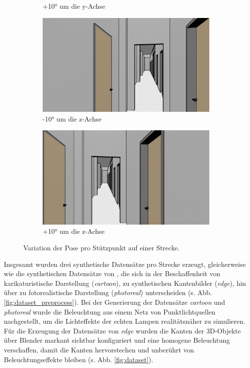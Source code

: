 \begin{figure}
\begin{subfigure}[t]{0.18\linewidth}
		\caption{+10° um die y-Achse}
		\label{subfig:iz0_y+10}
	\end{subfigure}
	\hfill
	\begin{subfigure}[t]{0.18\linewidth}
		\centering
		\includegraphics[width=\linewidth]{images/syn_dataset/00024.png}
		\caption{-10° um die z-Achse}
		\label{subfig:iz-10_y0}
	\end{subfigure}
	\hfill
	\begin{subfigure}[t]{0.18\linewidth}
		\centering
		\includegraphics[width=\linewidth]{images/syn_dataset/00022.png}
		\caption{+10° um die z-Achse}
		\label{subfig:iz+10_y0}
	\end{subfigure}
	\caption{Variation der Pose pro Stützpunkt auf einer Strecke.}
	\label{fig:dataset_variation}
\end{figure}

Insgesamt wurden drei synthetische Datensätze pro Strecke erzeugt, gleicherweise wie die synthetischen Datensätze von \citet{acharyaBIMPoseNetIndoorCamera2019}, die sich in der Beschaffenheit von karikaturistische Darstellung (\textit{cartoon}), zu synthetischen Kantenbilder (\textit{edge}), hin über zu fotorealistische Darstellung (\textit{photoreal}) unterscheiden (s. Abb. \ref{fig:dataset_preprocess}). Bei der Generierung der Datensätze \textit{cartoon} und \textit{photoreal} wurde die Beleuchtung aus einem Netz von Punktlichtquellen nachgestellt, um die Lichteffekte der echten Lampen realitätsnäher zu simulieren.
Für die Erzeugung der Datensätze von \textit{edge} wurden die Kanten der 3D-Objekte über Blender markant sichtbar konfiguriert und eine homogene Beleuchtung verschaffen, damit die Kanten hervorstechen und unberührt von Beleuchtungseffekte bleiben (s. Abb. \ref{fig:dataset}). 

